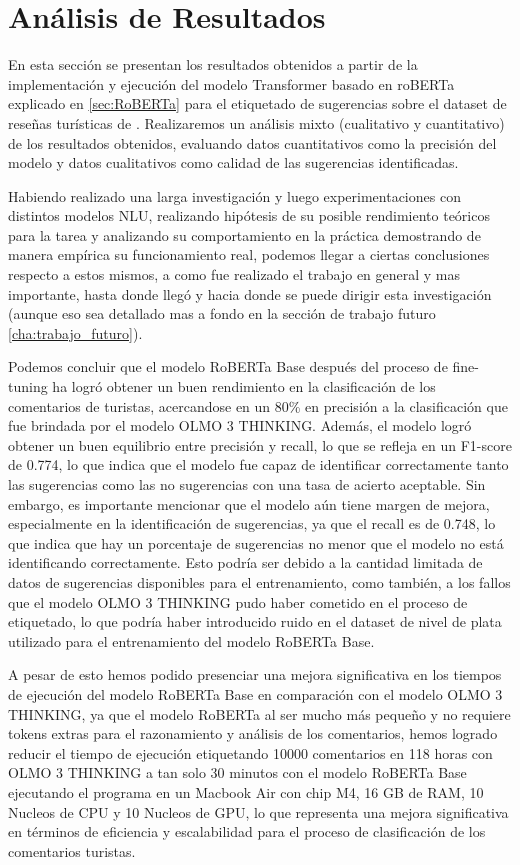 \chapter{Análisis de Resultados}
\label{cha:analisis_resultados}

En esta sección se presentan los resultados obtenidos a partir de la implementación y ejecución del modelo Transformer basado en roBERTa explicado en \ref{sec:RoBERTa} para el etiquetado de sugerencias sobre el dataset de reseñas turísticas de \textcite{tripadvisor-website}. Realizaremos un análisis mixto (cualitativo y cuantitativo) de los resultados obtenidos, evaluando datos cuantitativos como la precisión del modelo y datos cualitativos como calidad de las sugerencias identificadas.

Habiendo realizado una larga investigación y luego experimentaciones con distintos modelos NLU, realizando hipótesis de su posible rendimiento teóricos para la tarea y analizando su comportamiento en la práctica demostrando de manera empírica su funcionamiento real, podemos llegar a ciertas conclusiones respecto a estos mismos, a como fue realizado el trabajo en general y mas importante, hasta donde llegó y hacia donde se puede dirigir esta investigación (aunque eso sea detallado mas a fondo en la sección de trabajo futuro \ref{cha:trabajo_futuro}).

Podemos concluir que el modelo RoBERTa Base después del proceso de fine-tuning ha logró obtener un buen rendimiento en la clasificación de los comentarios de turistas, acercandose en un 80\% en precisión a la clasificación que fue brindada por el modelo OLMO 3 THINKING. Además, el modelo logró obtener un buen equilibrio entre precisión y recall, lo que se refleja en un F1-score de 0.774, lo que indica que el modelo fue capaz de identificar correctamente tanto las sugerencias como las no sugerencias con una tasa de acierto aceptable. Sin embargo, es importante mencionar que el modelo aún tiene margen de mejora, especialmente en la identificación de sugerencias, ya que el recall es de 0.748, lo que indica que hay un porcentaje de sugerencias no menor que el modelo no está identificando correctamente. Esto podría ser debido a la cantidad limitada de datos de sugerencias disponibles para el entrenamiento, como también, a los fallos que el modelo OLMO 3 THINKING pudo haber cometido en el proceso de etiquetado, lo que podría haber introducido ruido en el dataset de nivel de plata utilizado para el entrenamiento del modelo RoBERTa Base. 

A pesar de esto hemos podido presenciar una mejora significativa en los tiempos de ejecución del modelo RoBERTa Base en comparación con el modelo OLMO 3 THINKING, ya que el modelo RoBERTa al ser mucho más pequeño y no requiere tokens extras para el razonamiento y análisis de los comentarios, hemos logrado reducir el tiempo de ejecución etiquetando 10000 comentarios en 118 horas con OLMO 3 THINKING a tan solo 30 minutos con el modelo RoBERTa Base ejecutando el programa en un Macbook Air con chip M4, 16 GB de RAM, 10 Nucleos de CPU y 10 Nucleos de GPU, lo que representa una mejora significativa en términos de eficiencia y escalabilidad para el proceso de clasificación de los comentarios turistas.

